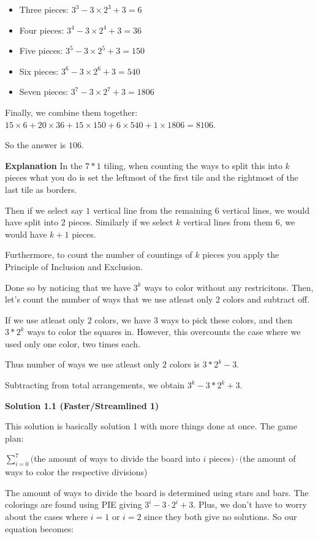 \begin{enumerate}
 
            \begin{itemize}
        \item Three pieces: $3^3-3\times 2^3+3=6$
        \item Four pieces: $3^4-3\times 2^4+3=36$
        \item Five pieces: $3^5-3\times 2^5+3=150$
        \item Six pieces: $3^6-3\times 2^6+3=540$
        \item Seven pieces: $3^7-3\times 2^7+3=1806$
            \end{itemize}
            Finally, we combine them together: $15\times 6+20\times 36+15\times 150+6\times 540+1\times 1806= 8106$.

 So the answer is $\boxed{106}$.

 \textbf{Explanation} In the $7*1$ tiling, when counting the ways to split this into $k$ pieces what you do is set the leftmost of the first tile and the rightmost of the last tile as borders.

 Then if we select say $1$ vertical line from the remaining $6$ vertical lines, we would have split into $2$ pieces. Similarly if we select $k$ vertical lines from them $6$, we would have $k+1$ pieces.

 Furthermore, to count the number of countings of $k$ pieces you apply the Principle of Inclusion and Exclusion.

 Done so by noticing that we have $3^k$ ways to color without any restricitons. Then, let's count the number of ways that we use atleast only $2$ colors and subtract off.

 If we use atleast only $2$ colors, we have $3$ ways to pick these colors, and then $3*2^k$ ways to color the squares in. However, this overcounts the case where we used only one color, two times each.

 Thus number of ways we use atleast only $2$ colors is $3*2^k-3$.

 Subtracting from total arrangements, we obtain $3^k-3*2^k+3$.

 



\textbf{Solution 1.1 (Faster/Streamlined 1)}

This solution is basically solution 1 with more things done at once. The game plan:

 $\sum_{i=0}^{7} ($the amount of ways to divide the board into $i$ pieces$) \cdot ($the amount of ways to color the respective divisions)

 The amount of ways to divide the board is determined using stars and bars. The colorings are found using PIE giving $3^i-3\cdot2^i+3$. Plus, we don't have to worry about the cases where $i=1$ or $i=2$ since they both give no solutions. So our equation becomes:


\end{enumerate}
